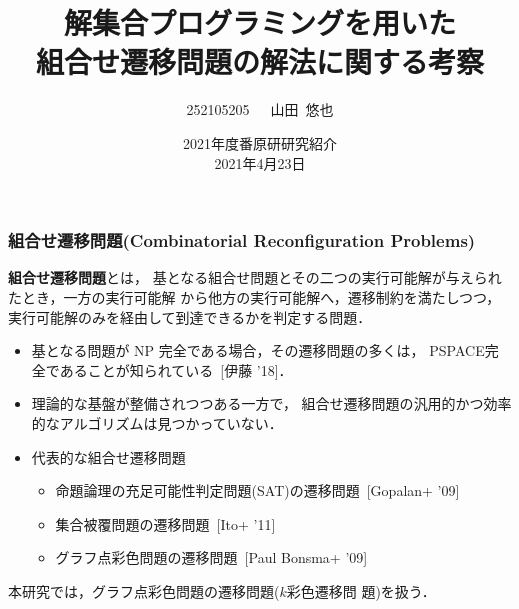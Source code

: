 \documentclass[dvipdfmx,11pt]{beamer}
\title[ASPを用いた組合せ遷移問題の解法に関する考察]{解集合プログラミングを用いた\\組合せ遷移問題の解法に関する考察}
\author{252105205~~~山田~悠也}
\date{2021年度番原研研究紹介\\2021年4月23日}
\institute{番原研究室}
\begin{document}
\begin{frame}\frametitle{}
  \titlepage
\end{frame}

\begin{frame}\frametitle{組合せ遷移問題(Combinatorial Reconfiguration Problems)}

  \begin{alertblock}{}
    \alert{\bf 組合せ遷移問題}とは，
    基となる組合せ問題とその二つの実行可能解が与えられたとき，一方の実行可能解
    から他方の実行可能解へ，遷移制約を満たしつつ，
    実行可能解のみを経由して到達できるかを判定する問題．
  \end{alertblock}

  \begin{itemize}
    \item 基となる問題が NP 完全である場合，その遷移問題の多くは，
      \alert{PSPACE完全}であることが知られている~[伊藤 '18]．
    \item 理論的な基盤が整備されつつある一方で，
      組合せ遷移問題の\alert{汎用的かつ効率的なアルゴリズムは見つかっていない}．
    \item 代表的な組合せ遷移問題
      \begin{itemize}
      \item 命題論理の充足可能性判定問題(SAT)の遷移問題~[Gopalan+ '09]
      \item 集合被覆問題の遷移問題~[Ito+ '11]
      \item グラフ点彩色問題の遷移問題~[Paul Bonsma+ '09]
      \end{itemize}
  \end{itemize}

  \pause
  \begin{alertblock}{}\centering
    本研究では，グラフ点彩色問題の遷移問題(\alert{$k$彩色遷移問
      題})を扱う．
  \end{alertblock}

  
\end{frame}
\end{document}
